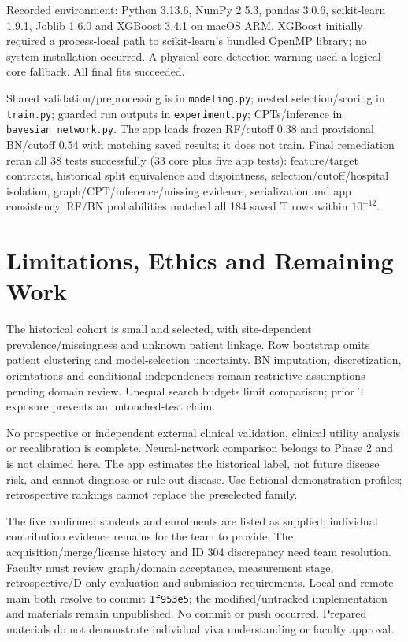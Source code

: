 \documentclass[conference]{IEEEtran}
\begin{document}
Recorded environment: Python 3.13.6, NumPy 2.5.3, pandas 3.0.6, scikit-learn 1.9.1, Joblib 1.6.0 and XGBoost 3.4.1 on macOS ARM. XGBoost initially required a process-local path to scikit-learn's bundled OpenMP library; no system installation occurred. A physical-core-detection warning used a logical-core fallback. All final fits succeeded.

Shared validation/preprocessing is in \texttt{modeling.py}; nested selection/scoring in \texttt{train.py}; guarded run outputs in \texttt{experiment.py}; CPTs/inference in \texttt{bayesian\_network.py}. The app loads frozen RF/cutoff 0.38 and provisional BN/cutoff 0.54 with matching saved results; it does not train. Final remediation reran all 38 tests successfully (33 core plus five app tests): feature/target contracts, historical split equivalence and disjointness, selection/cutoff/hospital isolation, graph/CPT/inference/missing evidence, serialization and app consistency. RF/BN probabilities matched all 184 saved T rows within $10^{-12}$.

\section{Limitations, Ethics and Remaining Work}
The historical cohort is small and selected, with site-dependent prevalence/missingness and unknown patient linkage. Row bootstrap omits patient clustering and model-selection uncertainty. BN imputation, discretization, orientations and conditional independences remain restrictive assumptions pending domain review. Unequal search budgets limit comparison; prior T exposure prevents an untouched-test claim.

No prospective or independent external clinical validation, clinical utility analysis or recalibration is complete. Neural-network comparison belongs to Phase 2 and is not claimed here. The app estimates the historical label, not future disease risk, and cannot diagnose or rule out disease. Use fictional demonstration profiles; retrospective rankings cannot replace the preselected family.

The five confirmed students and enrolments are listed as supplied; individual contribution evidence remains for the team to provide. The acquisition/merge/license history and ID 304 discrepancy need team resolution. Faculty must review graph/domain acceptance, measurement stage, retrospective/D-only evaluation and submission requirements. Local and remote main both resolve to commit \texttt{1f953e5}; the modified/untracked implementation and materials remain unpublished. No commit or push occurred. Prepared materials do not demonstrate individual viva understanding or faculty approval.
\end{document}
